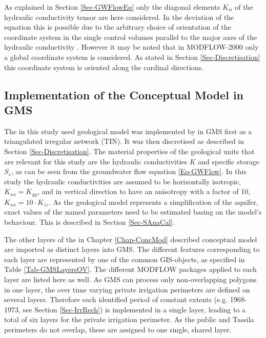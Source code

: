 As explained in Section \ref{Sec-GWFlowEq} only the diagonal elements $K_{ii}$ of the hydraulic conductivity tensor are here considered. In the deviation of the equation this is possible due to the arbitrary choice of orientation of the coordinate system in the single control volumes parallel to the major axes of the hydraulic conductivity \parencite{Harbaugh.2000}. However it may be noted that in MODFLOW-2000 only a global coordinate system is considered. As stated in Section \ref{Sec-Discretisation} this coordinate system is oriented along the cardinal directions.


\subsection{Implementation of the Conceptual Model in GMS}
\label{Sec-ImplToGMS}

The in this study used geological model was implemented by \textcite{Horn.2021} in GMS first as a triangulated irregular network (TIN). It was then discretised as described in Section \ref{Sec-Discretisation}. The material properties of the geological units that are relevant for this study are the hydraulic conductivities $K$ and specific storage $S_s$, as can be seen from the groundwater flow equation \eqref{Eq-GWFlow}. In this study the hydraulic conductivities are assumed to be horizontally isotropic, $K_{xx} = K_{yy}$, and in vertical direction to have an anisotropy with a factor of 10, $K_{xx} = 10 \cdot K_{zz}$. As the geological model represents a simplification of the aquifer, exact values of the named parameters need to be estimated basing on the model's behaviour. This is described in Section \ref{Sec-SAnaCal}.

The other layers of the in Chapter \ref{Chap-ConcMod} described conceptual model are imported as distinct layers into GMS. The different features corresponding to each layer are represented by one of the common GIS-objects, as specified in Table \ref{Tab-GMSLayersOV}. The different MODFLOW packages applied to each layer are listed here as well. As GMS can process only non-overlapping polygons in one layer, the over time varying private irrigation perimeters are defined on several layers. Therefore each identified period of constant extents (e.g. 1968-1973, see Section \ref{Sec-IrrRech}) is implemented in a single layer, leading to a total of six layers for the private irrigation perimeter. As the public and Tassila perimeters do not overlap, these are assigned to one single, shared layer.

